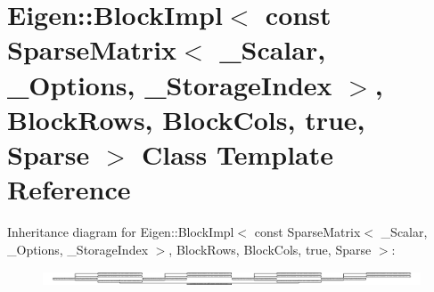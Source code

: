 \hypertarget{class_eigen_1_1_block_impl_3_01const_01_sparse_matrix_3_01___scalar_00_01___options_00_01___store3fd33d94eaf95572721ac85ec6beb63}{}\section{Eigen\+:\+:Block\+Impl$<$ const Sparse\+Matrix$<$ \+\_\+\+Scalar, \+\_\+\+Options, \+\_\+\+Storage\+Index $>$, Block\+Rows, Block\+Cols, true, Sparse $>$ Class Template Reference}
\label{class_eigen_1_1_block_impl_3_01const_01_sparse_matrix_3_01___scalar_00_01___options_00_01___store3fd33d94eaf95572721ac85ec6beb63}
Inheritance diagram for Eigen\+:\+:Block\+Impl$<$ const Sparse\+Matrix$<$ \+\_\+\+Scalar, \+\_\+\+Options, \+\_\+\+Storage\+Index $>$, Block\+Rows, Block\+Cols, true, Sparse $>$\+:\begin{figure}[H]
\begin{center}
\leavevmode
\includegraphics[height=0.455729cm]{class_eigen_1_1_block_impl_3_01const_01_sparse_matrix_3_01___scalar_00_01___options_00_01___store3fd33d94eaf95572721ac85ec6beb63}
\end{center}
\end{figure}
